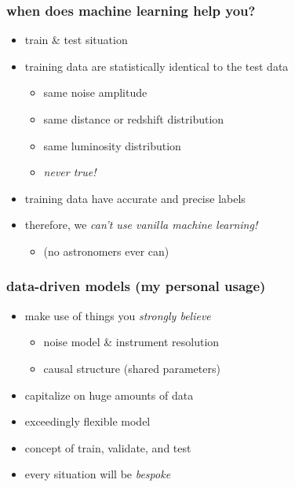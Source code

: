 \documentclass[pdftex]{beamer}
\begin{document}
\begin{frame}
  \frametitle{when does machine learning help you?}
  \begin{itemize}
  \item train \& test situation
  \item training data are statistically identical to the test data
    \begin{itemize}
    \item same noise amplitude
    \item same distance or redshift distribution
    \item same luminosity distribution
    \item \emph{never true!}
    \end{itemize}
  \item training data have accurate and precise labels
  \item therefore, we \emph{can't use vanilla machine learning!}
    \begin{itemize}
    \item (no astronomers ever can)
    \end{itemize}
  \end{itemize}
\end{frame}

\begin{frame}
  \frametitle{data-driven models (my personal usage)}
  \begin{itemize}
  \item make use of things you \emph{strongly believe}
    \begin{itemize}
    \item noise model \& instrument resolution
    \item causal structure (shared parameters)
    \end{itemize}
  \item capitalize on huge amounts of data
  \item exceedingly flexible model
  \item concept of train, validate, and test
  \item every situation will be \emph{bespoke}
  \end{itemize}
\end{frame}
\end{document}

